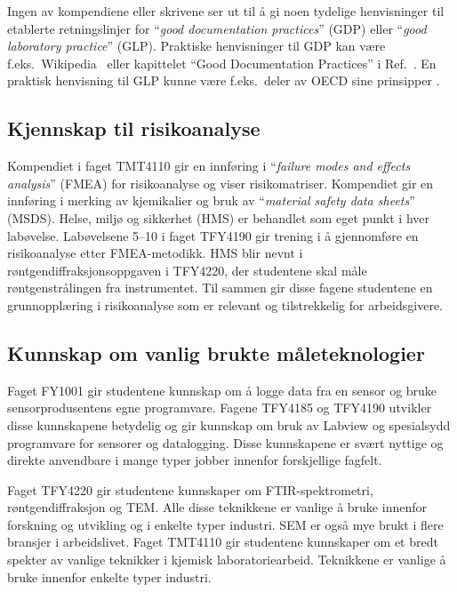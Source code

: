 \documentclass{article}
\begin{document}
Ingen av kompendiene eller skrivene ser ut til å gi noen tydelige henvisninger til etablerte retningslinjer for ``\emph{good documentation practices}'' (GDP) eller ``\emph{good laboratory practice}'' (GLP). Praktiske henvisninger til GDP kan være f.eks.~Wikipedia~\cite{WikiGDP} eller kapittelet ``Good Documentation Practices'' i Ref.~\cite{Davani2017}. En praktisk henvisning til GLP kunne være f.eks.~deler av OECD sine prinsipper \cite{OECD1997}.





\subsection{Kjennskap til risikoanalyse}
Kompendiet i faget TMT4110 gir en innføring i ``\emph{failure modes and effects analysis}'' (FMEA) for risikoanalyse og viser risikomatriser. Kompendiet gir en innføring i merking av kjemikalier og bruk av ``\emph{material safety data sheets}'' (MSDS). Helse, miljø og sikkerhet (HMS) er behandlet som eget punkt i hver labøvelse. Labøvelsene 5--10 i faget TFY4190 gir trening i å gjennomføre en risikoanalyse etter FMEA-metodikk. HMS blir nevnt i røntgendiffraksjonsoppgaven i TFY4220, der studentene skal måle røntgenstrålingen fra instrumentet. Til sammen gir disse fagene studentene en grunnopplæring i risikoanalyse som er relevant og tilstrekkelig for arbeidsgivere.


\subsection{Kunnskap om vanlig brukte måleteknologier}
\label{Teknikker}
Faget FY1001 gir studentene kunnskap om å logge data fra en sensor og bruke sensorprodusentens egne programvare. Fagene TFY4185 og TFY4190 utvikler disse kunnskapene betydelig og gir kunnskap om bruk av Labview og spesialsydd programvare for sensorer og datalogging. Disse kunnskapene er svært nyttige og direkte anvendbare i mange typer jobber innenfor forskjellige fagfelt.

Faget TFY4220 gir studentene kunnskaper om FTIR-spektrometri, røntgendiffraksjon og TEM. Alle disse teknikkene er vanlige å bruke innenfor forskning og utvikling og i enkelte typer industri. SEM er også mye brukt i flere bransjer i arbeidslivet. Faget TMT4110 gir studentene kunnskaper om et bredt spekter av vanlige teknikker i kjemisk laboratoriearbeid. Teknikkene er vanlige å bruke innenfor enkelte typer industri.
\end{document}
